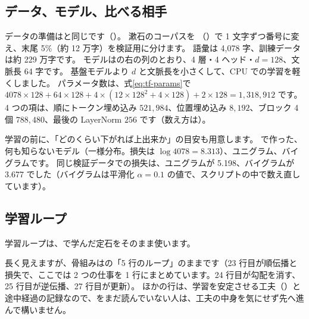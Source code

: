 \subsection*{データ、モデル、比べる相手}

データの準備はと同じです（）。
漱石のコーパスを （）で 1 文字ずつ番号に変え、末尾 5\%（約 12 万字）を検証用に分けます。
語彙は 4,078 字、訓練データは約 229 万字です。
モデルはの右の列のとおり、4 層・4 ヘッド・$d=128$、文脈長 64 字です。
基盤モデルより $d$ と文脈長を小さくして、CPU での学習を軽くしました。
パラメータ数は、式\eqref{eq:tf-params}で $4078\times128+64\times128+4\times(12\times128^2+4\times128)+2\times128 = 1{,}318{,}912$ です。
4 つの項は、順にトークン埋め込み $521{,}984$、位置埋め込み $8{,}192$、ブロック 4 個 $788{,}480$、最後の LayerNorm $256$ です（数え方は）。

学習の前に、「どのくらい下がれば上出来か」の目安も用意します。
で作った、何も知らないモデル（一様分布。損失は $\log 4078=8.313$）、ユニグラム、バイグラムです。
同じ検証データでの損失は、ユニグラムが 5.198、バイグラムが 3.677 でした（バイグラムは平滑化 $\alpha=0.1$ の値で、スクリプトの中で数え直しています）。

\subsection*{学習ループ}

学習ループは、で学んだ定石をそのまま使います。


長く見えますが、骨組みはの「5 行のループ」のままです（23 行目が順伝播と損失で、ここでは 2 つの仕事を 1 行にまとめています。24 行目が勾配を消す、25 行目が逆伝播、27 行目が更新）。
ほかの行は、学習を安定させる工夫（）と途中経過の記録なので、をまだ読んでいない人は、工夫の中身を気にせず先へ進んで構いません。

